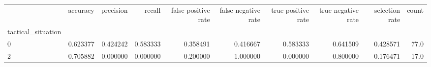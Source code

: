 \begin{tabular}{lrrrrrrrrr}
\toprule
{} &  accuracy &  precision &    recall &  false positive rate &  false negative rate &  true positive rate &  true negative rate &  selection rate &  count \\
tactical\_situation &           &            &           &                      &                      &                     &                     &                 &        \\
\midrule
0                  &  0.623377 &   0.424242 &  0.583333 &             0.358491 &             0.416667 &            0.583333 &            0.641509 &        0.428571 &   77.0 \\
2                  &  0.705882 &   0.000000 &  0.000000 &             0.200000 &             1.000000 &            0.000000 &            0.800000 &        0.176471 &   17.0 \\
\bottomrule
\end{tabular}
